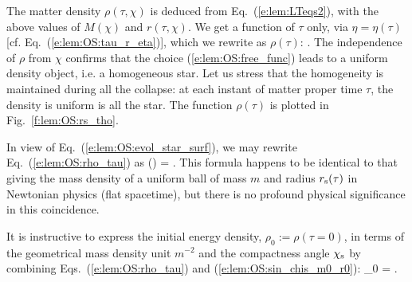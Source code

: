 The matter density $\rho(\tau,\chi)$ is deduced from Eq.~(\ref{e:lem:LTeqs2}), with the above
values of $M(\chi)$ and $r(\tau,\chi)$. We get a function of $\tau$ only,
via $\eta = \eta(\tau)$ [cf. Eq.~(\ref{e:lem:OS:tau_r_eta})],
which we rewrite as $\rho(\tau)$:
\be \label{e:lem:OS:rho_tau}
   .
\ee
The independence of $\rho$ from $\chi$ confirms that the choice
(\ref{e:lem:OS:free_func}) leads to a uniform density object, i.e.
a homogeneous star.
Let us stress that the homogeneity is maintained during all the collapse:
at each instant of matter proper time $\tau$, the density is uniform is all the star.
The function $\rho(\tau)$ is plotted in Fig.~\ref{f:lem:OS:rs_tho}.
\begin{remark}
In view of Eq.~(\ref{e:lem:OS:evol_star_surf}), we may rewrite Eq.~(\ref{e:lem:OS:rho_tau})
as
\be \label{e:lem:OS:rho_m0_r_tau}
    \rho(\tau) =  .
\ee
This formula happens to be identical to that giving the mass density of a uniform ball of mass
$m$ and radius $r_{\rm s}(\tau)$ in Newtonian physics (flat spacetime), but there is
no profound physical significance in this coincidence.
\end{remark}

It is instructive to express the initial energy density, $\rho_0 := \rho(\tau=0)$,
in terms of the geometrical mass density unit $m^{-2}$ and the compactness
angle $\chi_{\rm s}$ by combining Eqs.~(\ref{e:lem:OS:rho_tau}) and
(\ref{e:lem:OS:sin_chis_m0_r0}):
\be \label{e:lem:OS:rho0}
    \rho_0 =  .
\ee


